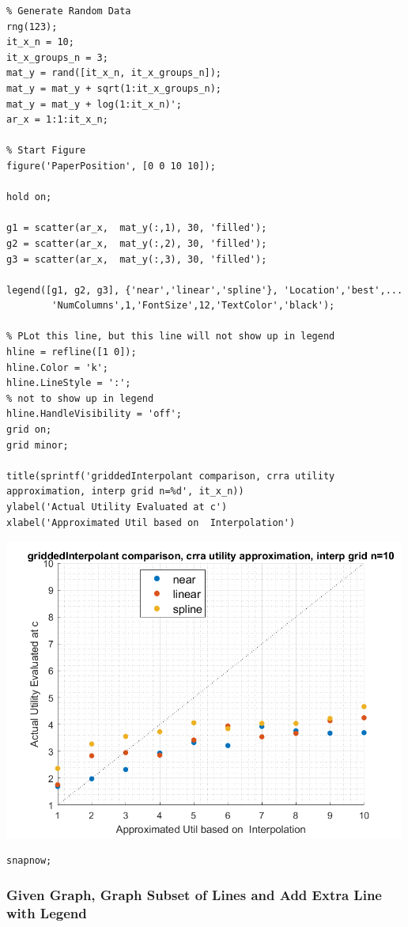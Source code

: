\documentclass[
]{book}
\begin{document}
\begin{verbatim}
% Generate Random Data
rng(123);
it_x_n = 10;
it_x_groups_n = 3;
mat_y = rand([it_x_n, it_x_groups_n]);
mat_y = mat_y + sqrt(1:it_x_groups_n);
mat_y = mat_y + log(1:it_x_n)';
ar_x = 1:1:it_x_n;

% Start Figure
figure('PaperPosition', [0 0 10 10]);

hold on;

g1 = scatter(ar_x,  mat_y(:,1), 30, 'filled');
g2 = scatter(ar_x,  mat_y(:,2), 30, 'filled');
g3 = scatter(ar_x,  mat_y(:,3), 30, 'filled');

legend([g1, g2, g3], {'near','linear','spline'}, 'Location','best',...
        'NumColumns',1,'FontSize',12,'TextColor','black');

% PLot this line, but this line will not show up in legend
hline = refline([1 0]);
hline.Color = 'k';
hline.LineStyle = ':';
% not to show up in legend
hline.HandleVisibility = 'off';
grid on;
grid minor;

title(sprintf('griddedInterpolant comparison, crra utility approximation, interp grid n=%d', it_x_n))
ylabel('Actual Utility Evaluated at c')
xlabel('Approximated Util based on  Interpolation')
\end{verbatim}

\includegraphics[width=5.20833in,height=\textheight]{img/fs_titling_images/figure_1.png}

\begin{verbatim}
snapnow;
\end{verbatim}

\hypertarget{given-graph-graph-subset-of-lines-and-add-extra-line-with-legend}{%
\subsubsection{Given Graph, Graph Subset of Lines and Add Extra Line with Legend}\label{given-graph-graph-subset-of-lines-and-add-extra-line-with-legend}}
\end{document}
